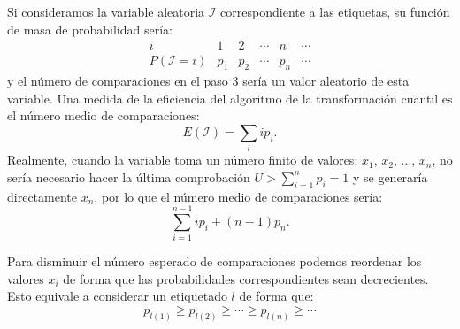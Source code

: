 \documentclass[
]{book}
\theoremstyle{break}
\theoremstyle{nonumberplain}
\begin{document}
Si consideramos la variable aleatoria \(\mathcal{I}\) correspondiente a las etiquetas, su función de masa de probabilidad sería:
\[\begin{array}{l|ccccc}
i & 1 & 2 & \cdots & n & \cdots \\ \hline
P\left( \mathcal{I}=i\right) & p_{1} & p_{2} & \cdots & p_{n} & \cdots 
\end{array}\]
y el número de comparaciones en el paso 3 sería un valor aleatorio de esta variable.
Una medida de la eficiencia del algoritmo de la transformación cuantil es
el número medio de comparaciones:
\[E\left( \mathcal{I}\right) =\sum_i ip_{i}.\]
Realmente, cuando la variable toma un número finito de valores:
\(x_{1}\), \(x_{2}\), \(\ldots\), \(x_{n}\), no sería necesario hacer
la última comprobación \(U>\sum_{i=1}^{n}p_{i}=1\) y se
generaría directamente \(x_{n}\), por lo que el
número medio de comparaciones sería:
\[\sum_{i=1}^{n-1}ip_{i}+\left( n-1\right)  p_{n}.\]

Para disminuir el número esperado de comparaciones podemos
reordenar los valores \(x_{i}\) de forma que las probabilidades
correspondientes sean decrecientes. Esto equivale a considerar
un etiquetado \(l\) de forma que:
\[p_{l\left( 1\right) }\geq p_{l\left( 2\right) }\geq \cdots \geq p_{l\left(
n\right) }\geq \cdots\]
\end{document}
